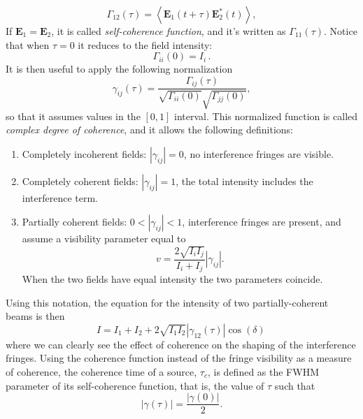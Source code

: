 \begin{equation}\label{eq:mutual-coherence}
	\Gamma_{12}(\tau) = \left\langle  \mathbf{E}_1(t+\tau)\mathbf{E}_2^*(t)   \right\rangle,
\end{equation}
If $\mathbf{E}_1 = \mathbf{E}_2$, it is called \emph{self-coherence function}, and it's written as $\Gamma_{11}(\tau)$. Notice that when $\tau = 0$ it reduces to the field intensity:
\begin{equation}
	\Gamma_{ii}(0) = I_i\,.
\end{equation}
It is then useful to apply the following normalization
\begin{equation}
	\gamma_{ij} (\tau) = \frac{\Gamma_{ij}(\tau)}{\sqrt{\Gamma_{ii}(0)}\sqrt{\Gamma_{jj}(0)}},
\end{equation}
so that it assumes values in the $[0,1]$ interval. This normalized function is called \emph{complex degree of coherence}, and it allows the following definitions:
\begin{enumerate}
	\item Completely incoherent fields: $|\gamma_{ij}| = 0$, no interference fringes are visible.
	\item Completely coherent fields: $|\gamma_{ij}| = 1$, the total intensity includes the interference term. 
	\item Partially coherent fields: $0 < |\gamma_{ij}| < 1$, interference fringes are present, and assume a visibility parameter equal to 
	\begin{equation}
		v = \frac{2\sqrt{I_i I_j}}{I_i + I_j}|\gamma_{ij}|.
	\end{equation}
	When the two fields have equal intensity the two parameters coincide.
\end{enumerate}

Using this notation, the equation for the intensity of two partially-coherent beams is then
\begin{equation}
	I = I_1 + I_2 + 2\sqrt{I_1I_2}|\gamma_{12}(\tau)| \cos( \delta )\,
\end{equation}
where we can clearly see the effect of coherence on the shaping of the interference fringes. Using the coherence function instead of the fringe visibility as a measure of coherence, the coherence time of a source, $\tau_c$, is defined as the \ac{FWHM} parameter of its self-coherence function, that is, the value of $\tau$ such that
\begin{equation}
	|\gamma(\tau)| = \frac{|\gamma(0)|}{2}.
\end{equation}

